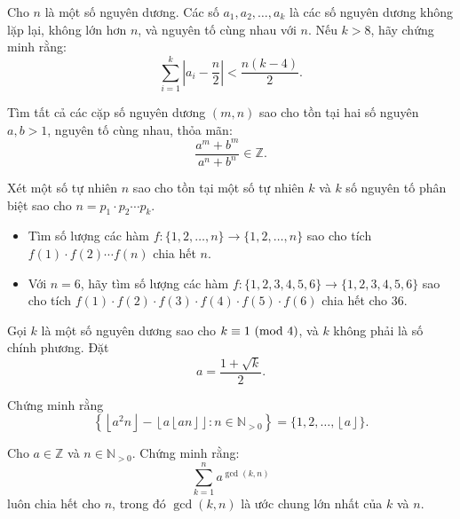 \documentclass[./m.tex]{subfiles}
\begin{document}
\begin{problem}\label{problem:KOR-2015-MO-P8}
	Cho \( n \) là một số nguyên dương. Các số \( a_1, a_2, \dots, a_k \) là các số nguyên dương không lặp lại, không lớn hơn \( n \),
	và nguyên tố cùng nhau với \( n \). Nếu \( k > 8 \), hãy chứng minh rằng:
	\[
		\sum_{i=1}^k \left| a_i - \frac{n}{2} \right| < \frac{n(k - 4)}{2}.
	\]
\end{problem}

\begin{problem}\label{problem:MEMO-2015-I-P4}
	Tìm tất cả các cặp số nguyên dương \( (m, n) \) sao cho tồn tại hai số nguyên \( a, b > 1 \), nguyên tố cùng nhau, thỏa mãn:
	\[
		\frac{a^m + b^m}{a^n + b^n} \in \mathbb{Z}.
	\]	
\end{problem}

\begin{problem}\label{problem:ROU-2015-MO-G10-P2}
    Xét một số tự nhiên \( n \) sao cho tồn tại một số tự nhiên \( k \) và \( k \) số nguyên tố phân biệt sao cho \( n = p_1 \cdot p_2 \cdots p_k \).
    \begin{itemize}[topsep=0pt, partopsep=0pt, itemsep=0pt]
        \item Tìm số lượng các hàm \( f : \{1, 2, \ldots, n\} \longrightarrow \{1, 2, \ldots, n\} \) sao cho tích \( f(1) \cdot f(2) \cdots f(n) \) chia hết \( n \).
        \item Với \( n = 6 \), hãy tìm số lượng các hàm \( f : \{1, 2, 3, 4, 5, 6\} \longrightarrow \{1, 2, 3, 4, 5, 6\} \)
        sao cho tích \( f(1)\cdot f(2)\cdot f(3)\cdot f(4)\cdot f(5)\cdot f(6) \) chia hết cho \( 36 \).
    \end{itemize}
\end{problem}

\begin{problem}\label{problem:ROU-2015-TST-D1-P4}
    Gọi \( k \) là một số nguyên dương sao cho \( k \equiv 1 \ (\mathrm{mod}\ 4) \), và \( k \) không phải là số chính phương. Đặt
    \[
        a = \frac{1 + \sqrt{k}}{2}.
    \]
    
    Chứng minh rằng
    \[
        \left\{ \left\lfloor a^2 n \right\rfloor - \left\lfloor a \left\lfloor a n \right\rfloor \right\rfloor : n \in \mathbb{N}_{>0} \right\} = \{ 1, 2, \ldots, \left\lfloor a \right\rfloor \}.
    \]
\end{problem}

\begin{problem}\label{problem:ROU-2015-TST-D2-P1}
    Cho \( a \in \mathbb{Z} \) và \( n \in \mathbb{N}_{>0} \). Chứng minh rằng:
    \[
        \sum_{k=1}^{n} a^{\gcd(k,n)}
    \]
    luôn chia hết cho \( n \), trong đó \( \gcd(k,n) \) là ước chung lớn nhất của \( k \) và \( n \).
\end{problem}
\end{document}
